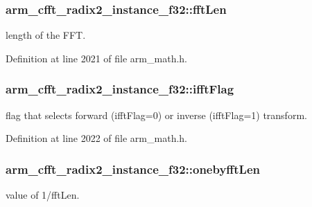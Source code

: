 \hypertarget{structarm__cfft__radix2__instance__f32_a2f915a1c29635c1623086aaaa726be8f}{
\subsubsection[{fft\-Len}]{ arm\-\_\-cfft\-\_\-radix2\-\_\-instance\-\_\-f32\-::fft\-Len}}\label{structarm__cfft__radix2__instance__f32_a2f915a1c29635c1623086aaaa726be8f}
length of the F\-F\-T. 

Definition at line 2021 of file arm\-\_\-math.\-h.

\hypertarget{structarm__cfft__radix2__instance__f32_a8dbe98d2c924e35e0a3fed2fe948176f}{
\subsubsection[{ifft\-Flag}]{ arm\-\_\-cfft\-\_\-radix2\-\_\-instance\-\_\-f32\-::ifft\-Flag}}\label{structarm__cfft__radix2__instance__f32_a8dbe98d2c924e35e0a3fed2fe948176f}
flag that selects forward (ifft\-Flag=0) or inverse (ifft\-Flag=1) transform. 

Definition at line 2022 of file arm\-\_\-math.\-h.

\hypertarget{structarm__cfft__radix2__instance__f32_a1d3d289d47443e597d88a40effd14b8f}{
\subsubsection[{onebyfft\-Len}]{ arm\-\_\-cfft\-\_\-radix2\-\_\-instance\-\_\-f32\-::onebyfft\-Len}}\label{structarm__cfft__radix2__instance__f32_a1d3d289d47443e597d88a40effd14b8f}
value of 1/fft\-Len. 

